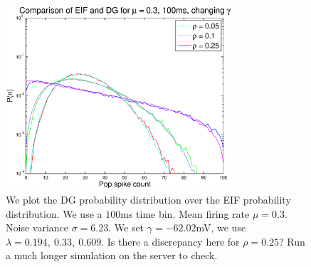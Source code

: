 \documentclass[11pt]{article}
\begin{document}
\begin{figure}[H]
\centering
\includegraphics[width=0.75\textwidth]{../Figures/EIF/DG_EIF_Macke_2a_mu_03_100ms_semilog}
\caption{\footnotesize We plot the DG probability distribution over the EIF probability distribution. We use a $100$ms time bin. Mean firing rate $\mu = 0.3$. Noise variance $\sigma = 6.23$. We set $\gamma = -62.02$mV, we use $\lambda = 0.194,~0.33,~0.609$. Is there a discrepancy here for $\rho = 0.25$? Run a much longer simulation on the server to check. }
\label{figdgeif1}
\end{figure}

\newpage
\end{document}
